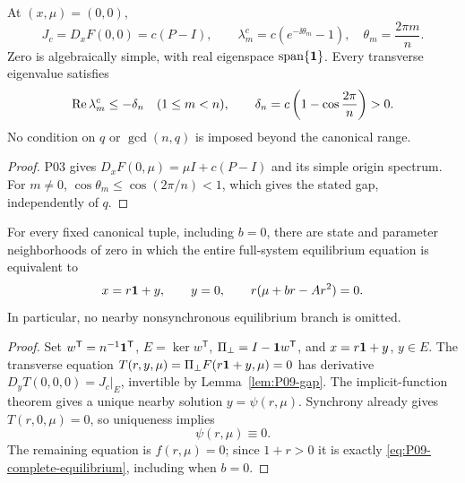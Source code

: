 \begin{lemma}
\label{lem:P09-gap}
At $(x,\mu)=(0,0)$,
\begin{equation}
 J_c=D_xF(0,0)=c(P-I),\qquad
 \lambda_m^c=c(e^{-\ii\theta_m}-1),\quad \theta_m=\frac{2\pi m}{n}.
 \label{eq:P09-critical-spectrum}
\end{equation}
Zero is algebraically simple, with real eigenspace
$\operatorname{span}\{\mathbf{1}\}$. Every transverse eigenvalue satisfies
\begin{equation}
 \operatorname{Re}\lambda_m^c\le-\delta_n\quad(1\le m<n),\qquad
 \delta_n=c\left(1-\cos\frac{2\pi}{n}\right)>0.
 \label{eq:P09-gap}
\end{equation}
No condition on $q$ or $\gcd(n,q)$ is imposed beyond the canonical range.
\end{lemma}
\begin{proof}
P03 gives $D_xF(0,\mu)=\mu I+c(P-I)$ and its simple origin
spectrum. For $m\ne0$, $\cos\theta_m\le\cos(2\pi/n)<1$,
which gives the stated gap, independently of $q$.
\end{proof}

\begin{theorem}
\label{thm:P09-reduction}
For every fixed canonical tuple, including $b=0$, there are state and
parameter neighborhoods of zero in which the entire full-system
equilibrium equation is equivalent to
\begin{equation}
 x=r\mathbf{1}+y,\qquad y=0,\qquad r(\mu+br-Ar^2)=0.
 \label{eq:P09-complete-equilibrium}
\end{equation}
In particular, no nearby nonsynchronous equilibrium branch is omitted.
\end{theorem}
\begin{proof}
Set $w^{\mathsf T}=n^{-1}\mathbf{1}^{\mathsf T}$,
$E=\ker w^{\mathsf T}$, $\Pi_\perp=I-\mathbf{1} w^{\mathsf T}$,
and $x=r\mathbf{1}+y$, $y\in E$. The transverse equation
$T(r,y,\mu)=\Pi_\perp F(r\mathbf{1}+y,\mu)=0$ has derivative
$D_yT(0,0,0)=J_c|_E$, invertible by Lemma~\ref{lem:P09-gap}.
The implicit-function theorem \cite[Ch.~1]{GuckenheimerHolmes1983}
gives a unique nearby solution $y=\psi(r,\mu)$. Synchrony already
gives $T(r,0,\mu)=0$, so uniqueness implies
\begin{equation}\psi(r,\mu)\equiv0.\label{eq:P09-psi-zero}\end{equation}
The remaining equation is $f(r,\mu)=0$; since $1+r>0$ it is
exactly \eqref{eq:P09-complete-equilibrium}, including when $b=0$.
\end{proof}

